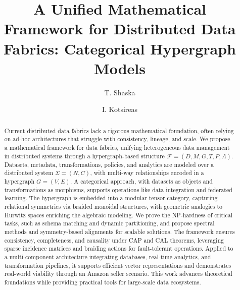 \documentclass{amsart}
\newcommand\cF{\mathcal{F}}
\begin{document}
 

\title[Categorical Hypergraph Models]{A Unified Mathematical Framework for Distributed Data Fabrics: Categorical Hypergraph Models}

\author{T. Shaska}

\author{I. Kotsireas}
 
 
\begin{abstract}
Current distributed data fabrics lack a rigorous mathematical foundation, often relying on ad-hoc architectures that struggle with consistency, lineage, and scale. We propose a mathematical framework for data fabrics, unifying heterogeneous data management in distributed systems through a hypergraph-based structure \( \cF = (D, M, G, T, P, A) \). Datasets, metadata, transformations, policies, and analytics are modeled over a distributed system \( \Sigma = (N, C) \), with multi-way relationships encoded in a hypergraph \( G = (V, E) \). A categorical approach, with datasets as objects and transformations as morphisms, supports operations like data integration and federated learning. The hypergraph is embedded into a modular tensor category, capturing relational symmetries via braided monoidal structures, with geometric analogies to Hurwitz spaces enriching the algebraic modeling. We prove the NP-hardness of critical tasks, such as schema matching and dynamic partitioning, and propose spectral methods and symmetry-based alignments for scalable solutions. The framework ensures consistency, completeness, and causality under CAP and CAL theorems, leveraging sparse incidence matrices and braiding actions for fault-tolerant operations. Applied to a multi-component architecture integrating databases, real-time analytics, and transformation pipelines, it supports efficient vector representations and demonstrates real-world viability through an Amazon seller scenario. This work advances theoretical foundations while providing practical tools for large-scale data ecosystems.
\end{abstract}


 

\end{document}

